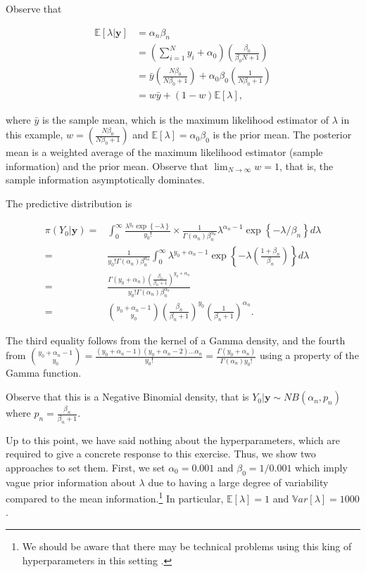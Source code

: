 Observe that 

\begin{align*}
	\mathbb{E}[\lambda|\mathbf{y}]&=\alpha_n\beta_n\\
	&=\left(\sum_{i=1}^N y_i + \alpha_0\right)\left(\frac{\beta_0}{\beta_0 N + 1}\right)\\
	&=\bar{y}\left(\frac{N\beta_0}{N\beta_0+1}\right)+\alpha_0\beta_0\left(\frac{1}{N\beta_0+1}\right)\\
	&=w\bar{y}+(1-w)\mathbb{E}[\lambda],
\end{align*}

where $\bar{y}$ is the sample mean, which is the maximum likelihood estimator of $\lambda$ in this example, $w=\left(\frac{N\beta_0}{N\beta_0+1}\right)$ and $\mathbb{E}[\lambda]=\alpha_0\beta_0$ is the prior mean. The posterior mean is a weighted average of the maximum likelihood estimator (sample information) and the prior mean. Observe that $\lim_{N\rightarrow\infty}w= 1$, that is, the sample information asymptotically dominates.

The predictive distribution is

\begin{align*}
	\pi(Y_0|\mathbf{y})=&\int_{0}^{\infty}\frac{\lambda^{y_0}\exp\left\{-\lambda\right\}}{y_0!}\times \frac{1}{\Gamma(\alpha_n)\beta_n^{\alpha_n}}\lambda^{\alpha_n-1}\exp\left\{-\lambda/\beta_n\right\} d\lambda\\
	=&\frac{1}{y_0!\Gamma(\alpha_n)\beta_n^{\alpha_n}}\int_{0}^{\infty}\lambda^{y_0+\alpha_n-1}\exp\left\{-\lambda\left(\frac{1+\beta_n}{\beta_n}\right)\right\}d\lambda\\
	=&\frac{\Gamma(y_0+\alpha_n)\left(\frac{\beta_n}{\beta_n+1}\right)^{y_0+\alpha_n}}{y_0!\Gamma(\alpha_n)\beta_n^{\alpha_n}}\\
	=&{y_0+\alpha_n-1 \choose y_0}\left(\frac{\beta_n}{\beta_n+1}\right)^{y_0}\left(\frac{1}{\beta_n+1}\right)^{\alpha_n}.
\end{align*}

The third equality follows from the kernel of a Gamma density, and the fourth from ${y_0+\alpha_n-1 \choose y_0}=\frac{(y_0+\alpha_n-1)(y_0+\alpha_n-2)\dots\alpha_n}{y_0!}=\frac{\Gamma(y_0+\alpha_n)}{\Gamma(\alpha_n)y_0!}$ using a property of the Gamma function.

Observe that this is a Negative Binomial density, that is $Y_0|\mathbf{y}\sim NB(\alpha_n,p_n)$ where $p_n=\frac{\beta_n}{\beta_n+1}$. 

Up to this point, we have said nothing about the hyperparameters, which are required to give a concrete response to this exercise. Thus, we show two approaches to set them. First, we set $\alpha_0=0.001$ and $\beta_0=1/0.001$ which imply vague prior information about $\lambda$ due to having a large degree of variability compared to the mean information.\footnote{We should be aware that there may be technical problems using this king of hyperparameters in this setting \cite{gelman2006prior}.} In particular, $\mathbb{E}[\lambda]=1$ and $\mathbb{V}ar[\lambda]=1000$. 

